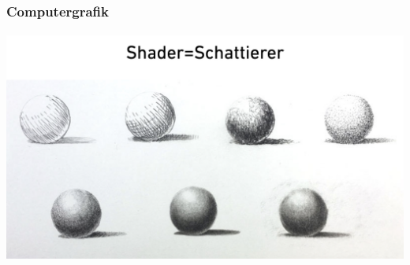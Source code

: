 \documentclass{beamer}
\begin{document}
\begin{frame}
    \frametitle{Computergrafik}
\framesubtitle{}

\includegraphics[scale=0.12]{images/Shaderday_Intro/Shaderday_Intro_001} 
\end{frame}
\end{document}
